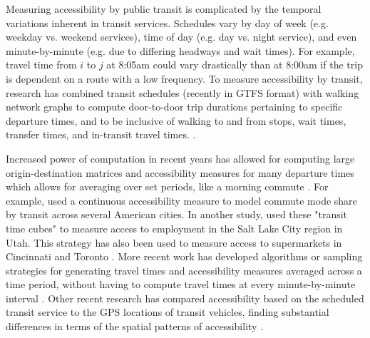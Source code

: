 \documentclass[11 pt, letterpaper]{article}
\begin{document}
{Measuring accessibility by public transit is complicated by the temporal variations inherent in transit services. Schedules vary by day of week (e.g. weekday vs. weekend services), time of day (e.g. day vs. night service), and even minute-by-minute (e.g. due to differing headways and wait times). For example, travel time from $i$ to $j$ at 8:05am could vary drastically than at 8:00am if the trip is dependent on a route with a low frequency. To measure accessibility by transit, research has combined transit schedules (recently in GTFS format) with walking network graphs to compute door-to-door trip durations pertaining to specific departure times, and to be inclusive of walking to and from stops, wait times, transfer times, and in-transit travel times. \cite{osullivan2000,lei2010,farber2017}. 

Increased power of computation in recent years has allowed for computing large origin-destination matrices and accessibility measures for many departure times which allows for averaging over set periods, like a morning commute \cite{owen2015,farber2017,conway2017}. For example,  used a continuous accessibility measure to model commute mode share by transit across several American cities. In another study,  used these "transit time cubes" to measure access to employment in the Salt Lake City region in Utah. This strategy has also been used to measure access to supermarkets in Cincinnati \cite{farber2014b} and Toronto \cite{widener2017}. More recent work has developed algorithms or sampling strategies for generating travel times and accessibility measures averaged across a time period, without having to compute travel times at every minute-by-minute interval \cite{conway2017,owen2018}. Other recent research has compared accessibility based on the scheduled transit service to the GPS locations of transit vehicles, finding substantial differences in terms of the spatial patterns of accessibility \cite{wessel2017}.

}
\end{document}
